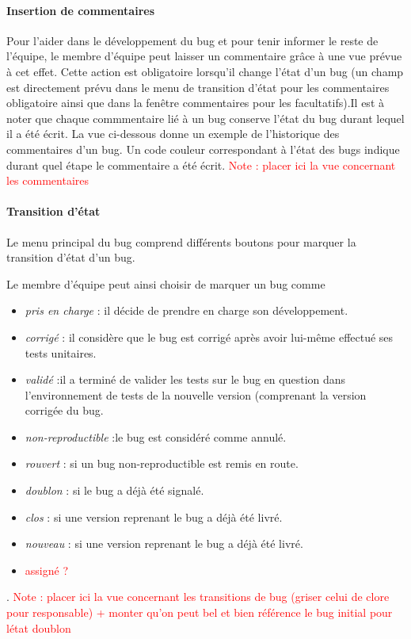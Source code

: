 \documentclass{article}[12pt]
\begin{document}
\paragraph{Insertion de commentaires}
Pour l'aider dans le développement du bug et pour tenir informer le reste de l'équipe, le membre d'équipe peut laisser un commentaire grâce à une vue prévue à cet effet. Cette action est obligatoire lorsqu'il change l'état d'un bug (un champ est directement prévu dans le menu de transition d'état pour les commentaires obligatoire ainsi que dans la fenêtre commentaires pour les facultatifs).Il est à noter que chaque commmentaire lié à un bug conserve l'état du bug durant lequel il a été écrit. La vue ci-dessous donne un exemple de l'historique des commentaires d'un bug. Un code couleur correspondant à l'état des bugs indique durant quel étape le commentaire a été écrit. 
 \textcolor{red}{Note : placer ici la vue concernant les commentaires}
\paragraph{Transition d'état}
Le menu principal du bug comprend différents boutons pour marquer la transition d'état d'un bug.

 Le membre d'équipe peut ainsi choisir de marquer un bug comme 
 
 \begin{itemize}
 	\item \textit{pris en charge} : il décide de prendre en charge son développement.
 	\item \textit{corrigé} : il considère que le bug est corrigé après avoir lui-même effectué ses tests unitaires.
 	\item \textit{validé} :il a terminé de valider les tests sur le bug en question dans l'environnement de tests de la nouvelle version (comprenant la version corrigée  du bug.
 	\item \textit{non-reproductible} :le bug est considéré comme annulé.
 	\item \textit{rouvert} : si un bug non-reproductible est remis en route.
 	\item \textit{doublon} : si le bug a déjà été signalé.
 	\item \textit{clos} : si une version reprenant le bug a déjà été livré.
 	\item \textit{nouveau} : si une version reprenant le bug a déjà été livré.
 	\item \textcolor{red}{assigné ?}
 \end{itemize}.
 \textcolor{red}{Note : placer ici la vue concernant les transitions de bug (griser celui de clore pour responsable) + monter qu'on peut bel et bien référence le bug initial pour létat doublon}
\end{document}

